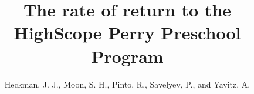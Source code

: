 
\title{The rate of return to the HighScope Perry Preschool Program}
\author{Heckman, J. J., Moon, S. H., Pinto, R., Savelyev, P., and Yavitz, A.}

\date{}

\let\otp\titlepage

